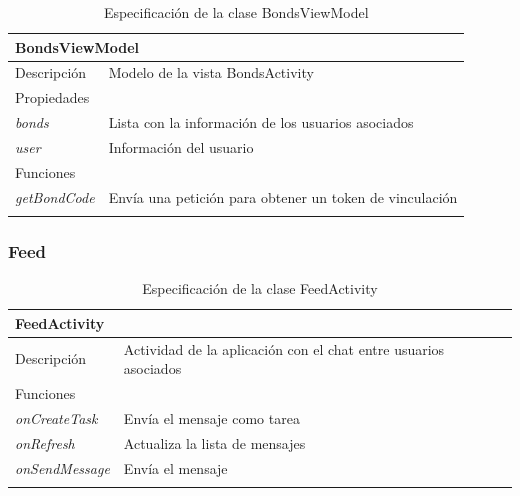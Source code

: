 \begin{longtable}{|p{} p{}|}
    \hline
    \multicolumn{2}{|l|}{BondsViewModel} \\ \hline \hline
    Descripción      & Modelo de la vista BondsActivity \\ \hline
    \multicolumn{2}{|l|}{Propiedades} \\
    \emph{bonds}  & Lista con la información de los usuarios asociados  \\
    \emph{user}  & Información del usuario  \\ \hline
    \multicolumn{2}{|l|}{Funciones} \\
    \emph{getBondCode}  & Envía una petición para obtener un token de vinculación \\ \hline
    \caption{Especificación de la clase BondsViewModel}
    \label{class:app:bonds_view_model}
\end{longtable}

\vspace{-32pt}
\subsubsection{Feed}

\vspace{-7pt}
\begin{longtable}{|p{} p{}|}
    \hline
    \multicolumn{2}{|l|}{FeedActivity} \\ \hline \hline
    Descripción      & Actividad de la aplicación con el chat entre usuarios asociados \\ \hline
    \multicolumn{2}{|l|}{Funciones} \\
    \emph{onCreateTask}  & Envía el mensaje como tarea \\
    \emph{onRefresh}  & Actualiza la lista de mensajes  \\ 
    \emph{onSendMessage}  & Envía el mensaje  \\ \hline
    \caption{Especificación de la clase FeedActivity}
    \label{class:app:feed_activity}
\end{longtable}

